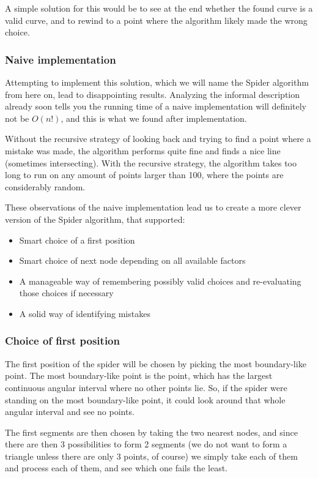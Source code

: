 \documentclass[11pt]{article}
\begin{document}
A simple solution for this would be to see at the end whether the found curve is a valid curve, and to rewind to a point where the algorithm likely made the wrong choice.

\subsubsection{Naive implementation} 

Attempting to implement this solution, which we will name the Spider algorithm from here on, lead to disappointing results. Analyzing the informal description already soon tells you the running time of a naive implementation will definitely not be $O(n!)$, and this is what we found after implementation.

Without the recursive strategy of looking back and trying to find a point where a mistake was made, the algorithm performs quite fine and finds a nice line (sometimes intersecting). With the recursive strategy, the algorithm takes too long to run on any amount of points larger than 100, where the points are considerably random.

These observations of the naive implementation lead us to create a more clever version of the Spider algorithm, that supported:
\begin{itemize}
\item Smart choice of a first position
\item Smart choice of next node depending on all available factors
\item A manageable way of remembering possibly valid choices and re-evaluating those choices if necessary
\item A solid way of identifying mistakes
\end{itemize}


\subsubsection{Choice of first position} 

The first position of the spider will be chosen by picking the most boundary-like point. The most boundary-like point is the point, which has the largest continuous angular interval where no other points lie. So, if the spider were standing on the most boundary-like point, it could look around that whole angular interval and see no points.

The first segments are then chosen by taking the two nearest nodes, and since there are then 3 possibilities to form 2 segments (we do not want to form a triangle unless there are only 3 points, of course) we simply take each of them and process each of them, and see which one fails the least.
\end{document}
